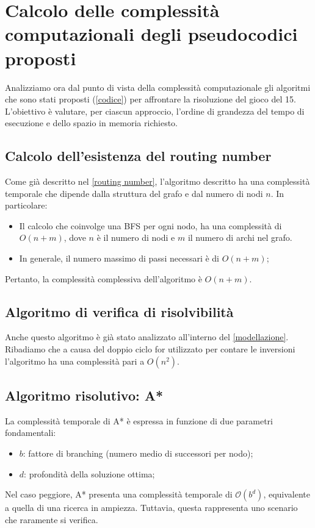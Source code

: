 \chapter{Calcolo delle complessità computazionali degli pseudocodici proposti}
Analizziamo ora dal punto di vista della complessità computazionale gli algoritmi che sono stati proposti (\cref{codice}) per affrontare la risoluzione del gioco del 15. L’obiettivo è valutare, per ciascun approccio, l’ordine di grandezza del tempo di esecuzione e dello spazio in memoria richiesto.

\section{Calcolo dell'esistenza del routing number}
Come già descritto nel \cref{routing number}, l'algoritmo descritto ha una complessità temporale che dipende dalla struttura del grafo e dal numero di nodi $n$. In particolare:

\begin{itemize}
    \item Il calcolo che coinvolge una BFS per ogni nodo, ha una complessità di $O(n + m)$, dove $n$ è il numero di nodi e $m$ il numero di archi nel grafo.
    \item In generale, il numero massimo di passi necessari è di $O(n+m)$;
\end{itemize}

Pertanto, la complessità complessiva dell'algoritmo è $O(n+m)$.

\section{Algoritmo di verifica di risolvibilità}
Anche questo algoritmo è già stato analizzato all'interno del \cref{modellazione}. Ribadiamo che a causa del doppio ciclo for utilizzato per contare le inversioni l'algoritmo ha una complessità pari a $O(n^2)$. 

\section{Algoritmo risolutivo: A*}
La complessità temporale di A* è espressa in funzione di due parametri fondamentali:\begin{itemize}
    \item \textbf{$b$}: fattore di branching (numero medio di successori per nodo);
    \item \textbf{$d$}: profondità della soluzione ottima;
\end{itemize}
Nel caso peggiore, A* presenta una complessità temporale di $\mathcal{O}(b^d)$, equivalente a quella di una ricerca in ampiezza. Tuttavia, questa rappresenta uno scenario che raramente si verifica.

